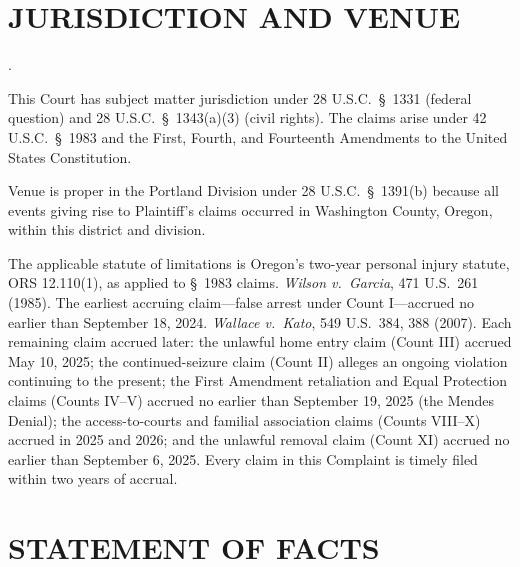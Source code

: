 \documentclass[12pt,letterpaper]{article}
\newcounter{complaintpara}
\newenvironment{paras}{%
	\begin{list}{\arabic{complaintpara}.}{%
			\setlength{\leftmargin}{0.5in}%
			\setlength{\labelwidth}{0.4in}%
			\setlength{\labelsep}{0.1in}%
			\setlength{\itemsep}{0pt}%
			\setlength{\parsep}{0pt}%
			\setlength{\topsep}{6pt}%
		}%
	}{%
	\end{list}%
}
\newcommand{\sect}{§}
\begin{document}
	\section*{JURISDICTION AND VENUE}
	\begin{paras}
		
		\item This Court has subject matter jurisdiction under
		28 U.S.C.\ \sect\ 1331 (federal question) and 28 U.S.C.\
		\sect\ 1343(a)(3) (civil rights). The claims arise under
		42 U.S.C.\ \sect\ 1983 and the First, Fourth, and Fourteenth
		Amendments to the United States Constitution.
		
		\item Venue is proper in the Portland Division under
		28 U.S.C.\ \sect\ 1391(b) because all events giving rise to
		Plaintiff's claims occurred in Washington County, Oregon, within
		this district and division.
		
		\item The applicable statute of limitations is Oregon's two-year
		personal injury statute, ORS 12.110(1), as applied to \sect\ 1983
		claims. \textit{Wilson v.\ Garcia}, 471 U.S.\ 261 (1985). The
		earliest accruing claim---false arrest under Count I---accrued no
		earlier than September 18, 2024. \textit{Wallace v.\ Kato},
		549 U.S.\ 384, 388 (2007). Each remaining claim accrued later:
		the unlawful home entry claim (Count III) accrued May 10, 2025;
		the continued-seizure claim (Count II) alleges an ongoing violation
		continuing to the present; the First Amendment retaliation and
		Equal Protection claims (Counts IV--V) accrued no earlier than
		September 19, 2025 (the Mendes Denial); the access-to-courts and
		familial association claims (Counts VIII--X) accrued in 2025 and
		2026; and the unlawful removal claim (Count XI) accrued no earlier
		than September 6, 2025. Every claim in this Complaint is timely
		filed within two years of accrual.
		
	\end{paras}
	\section*{STATEMENT OF FACTS}
\end{document}
